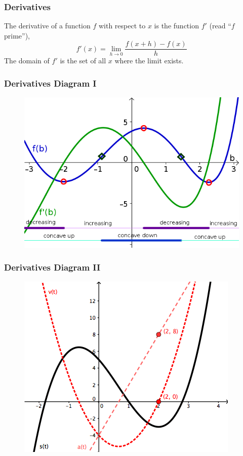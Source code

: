 \documentclass[xcolor=dvipsnames]{beamer}
\begin{document}
\begin{frame}
  \frametitle{Derivatives}
The derivative of a function $f$ with respect to $x$ is the function
$f'$ (read ``$f$ prime''),
\begin{equation}
  \label{eq:lohfasoe}
f'(x)=\lim_{h\rightarrow{}0}\frac{f(x+h)-f(x)}{h}
\end{equation}
The domain of $f'$ is the set of all $x$ where the limit exists.
\end{frame}

\begin{frame}
  \frametitle{Derivatives Diagram I}
  \begin{figure}[h]
    \includegraphics[scale=1.8]{./diagrams/derivs2.png}
  \end{figure}
\end{frame}

\begin{frame}
  \frametitle{Derivatives Diagram II}
  \begin{figure}[h]
    \includegraphics[scale=.6]{./diagrams/derivs1.png}
  \end{figure}
\end{frame}
\end{document}
